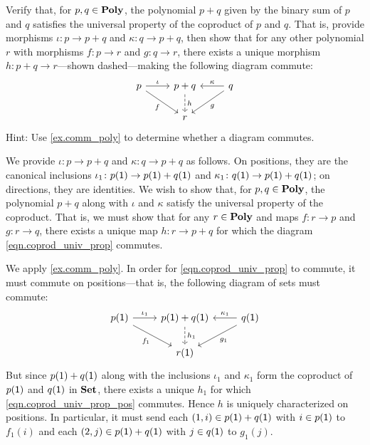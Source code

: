 \documentclass[Book-Poly]{subfiles}
\begin{document}
\begin{exercise}
Verify that, for $p, q \in \mathbf{Poly}$, the polynomial $p+q$ given by the binary sum of $p$ and $q$ satisfies the universal property of the coproduct of $p$ and $q$.
That is, provide morphisms $\iota \colon p \to p + q$ and $\kappa \colon q \to p + q$, then show that for any other polynomial $r$ with morphisms $f \colon p \to r$ and $g \colon q \to r$, there exists a unique morphism $h \colon p+q \to r$---shown dashed---making the following diagram commute:
\begin{equation} \label{eqn.coprod_univ_prop}
\begin{tikzcd}
	p \ar[r, "\iota"] \ar[dr, "f"'] &
	p + q \ar[d, "h", dashed] &
	q \ar[l, "\kappa"'] \ar[dl, "g"] \\
	& r
\end{tikzcd}
\end{equation}
Hint: Use \cref{ex.comm_poly} to determine whether a diagram commutes.
\begin{solution}
We provide $\iota \colon p \to p + q$ and $\kappa \colon q \to p + q$ as follows.
On positions, they are the canonical inclusions $\iota_1 \colon p(\textsf{1}) \to p(\textsf{1})+q(\textsf{1})$ and $\kappa_1 \colon q(\textsf{1}) \to p(\textsf{1})+q(\textsf{1})$; on directions, they are identities.
We wish to show that, for $p, q \in \mathbf{Poly}$, the polynomial $p+q$ along with $\iota$ and $\kappa$ satisfy the universal property of the coproduct.
That is, we must show that for any $r \in \mathbf{Poly}$ and maps $f \colon r \to p$ and $g \colon r \to q$, there exists a unique map $h \colon r \to p+q$ for which the diagram \eqref{eqn.coprod_univ_prop} commutes.

We apply \cref{ex.comm_poly}.
In order for \eqref{eqn.coprod_univ_prop} to commute, it must commute on positions---that is, the following diagram of sets must commute:
\begin{equation} \label{eqn.coprod_univ_prop_pos}
\begin{tikzcd}
	p(\1) \ar[r, "\iota_1"] \ar[dr, "f_1"'] &
	p(\1) + q(\1) \ar[d, "h_1", dashed] &
	q(\1) \ar[l, "\kappa_1"'] \ar[dl, "g_1"] \\
	& r(\1)
\end{tikzcd}
\end{equation}
But since $p(1)+q(\textsf{1})$ along with the inclusions $\iota_1$ and $\kappa_1$ form the coproduct of $p(\textsf{1})$ and $q(\textsf{1})$ in $\mathbf{Set}$, there exists a unique $h_1$ for which \eqref{eqn.coprod_univ_prop_pos} commutes.
Hence $h$ is uniquely characterized on positions.
In particular, it must send each $(1,i) \in p(\textsf{1})+q(\textsf{1})$ with $i \in p(\textsf{1})$ to $f_1(i)$ and each $(2,j) \in p(\textsf{1})+q(\textsf{1})$ with $j \in q(\textsf{1})$ to $g_1(j)$.


\end{solution}
\end{exercise}
\end{document}
